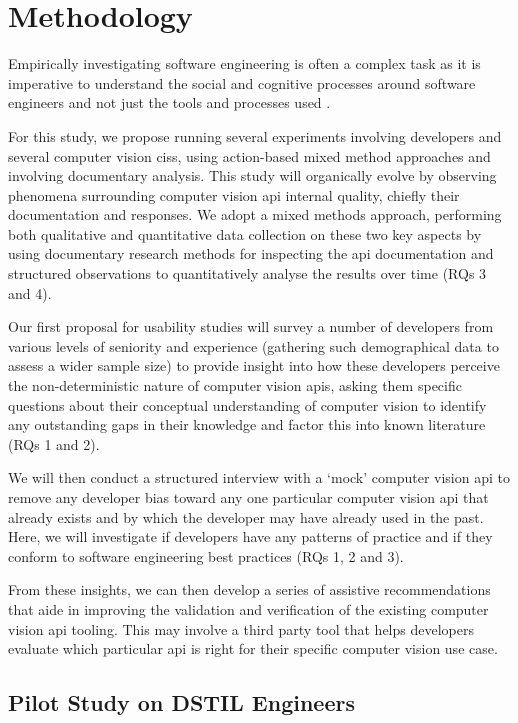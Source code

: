 \chapter{Methodology}

Empirically investigating software engineering is often a complex task as it is imperative to understand the social and cognitive processes around software engineers and not just the tools and processes used \citep[ch. 11]{Shull:2007vh}. 

For this study, we propose running several experiments involving developers and several computer vision \glspl{cis}, using action-based mixed method approaches and involving documentary analysis. This study will organically evolve by observing phenomena surrounding computer vision \gls{api} internal quality, chiefly their documentation and responses. We adopt a mixed methods approach, performing both qualitative and quantitative data collection on these two key aspects by using documentary research methods for inspecting the \gls{api} documentation and structured observations to quantitatively analyse the results over time (RQs 3 and 4).

 Our first proposal for usability studies will survey a number of developers from various levels of seniority and experience (gathering such demographical data to assess a wider sample size) to provide insight into how these developers perceive the non-deterministic nature of computer vision \glspl{api}, asking them specific questions about their conceptual understanding of computer vision to identify any outstanding gaps in their knowledge and factor this into known literature (RQs 1 and 2).

We will then conduct a structured interview with a `mock' computer vision \gls{api} to remove any developer bias toward any one particular computer vision \gls{api} that already exists and by which the developer may have already used in the past. Here, we will investigate if developers have any patterns of practice and if they conform to software engineering best practices (RQs 1, 2 and 3).

From these insights, we can then develop a series of assistive recommendations that aide in improving the validation and verification of the existing computer vision \gls{api} tooling. This may involve a third party tool that helps developers evaluate which particular \gls{api} is right for their specific computer vision use case.

\section{Pilot Study on DSTIL Engineers}

